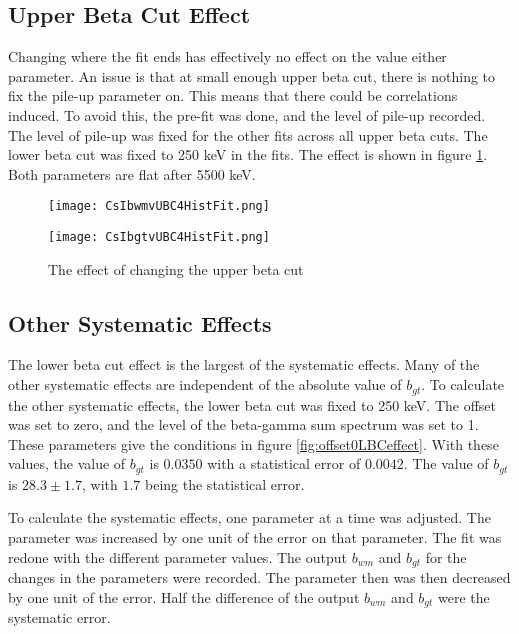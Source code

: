 \documentclass[../MaxHughesThesis.tex]{subfiles}
\begin{document}
\subsection{Upper Beta Cut Effect}

Changing where the fit ends has effectively no effect on the value either parameter.
An issue is that at small enough upper beta cut, there is nothing to fix the pile-up parameter on. 
This means that there could be correlations induced.
To avoid this, the  pre-fit was done, and the level of pile-up recorded.
The level of pile-up was fixed for the other fits across all upper beta cuts.
The lower beta cut was fixed to 250 keV in the fits. 
The effect is shown in figure \ref{fig:UBCEffect}.
Both parameters are flat after 5500 keV.

\begin{figure}
    \centering
    \begin{minipage}{0.50\textwidth}
        \centerline{\texttt{[image: CsIbwmvUBC4HistFit.png]}}
    \end{minipage}\hfill
    \begin{minipage}{0.50\textwidth}
        \centerline{\texttt{[image: CsIbgtvUBC4HistFit.png]}}
    \end{minipage}
    \caption{The effect of changing the upper beta cut}
    \label{fig:UBCEffect}
\end{figure}


\subsection{Other Systematic Effects}

The lower beta cut effect is the largest of the systematic effects.
Many of the other systematic effects are independent of the absolute value of $b_{gt}$.
To calculate the other systematic effects, the lower beta cut was fixed to 250 keV.
The offset was set to zero, and the level of the beta-gamma sum spectrum was set to 1.
These parameters give the conditions in figure \ref{fig:offset0LBCeffect}.
With these values, the value of $b_{gt}$ is $0.0350$ with a statistical error of $0.0042$.
The value of $b_{gt}$ is $28.3 \pm 1.7$, with $1.7$ being the statistical error.

To calculate the systematic effects, one parameter at a time was adjusted.
The parameter was increased by one unit of the error on that parameter.
The fit was redone with the different parameter values.
The output $b_{wm}$ and $b_{gt}$ for the changes in the parameters were recorded.
The parameter then was then decreased by one unit of the error.
Half the difference of the output $b_{wm}$ and $b_{gt}$ were the systematic error.
\end{document}
